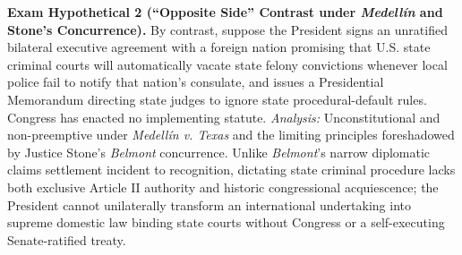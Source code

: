 \documentclass[12pt]{article}
\begin{document}
\textbf{Exam Hypothetical 2 (``Opposite Side'' Contrast under \textit{Medell\'in} and Stone's Concurrence).} By contrast, suppose the President signs an unratified bilateral executive agreement with a foreign nation promising that U.S. state criminal courts will automatically vacate state felony convictions whenever local police fail to notify that nation's consulate, and issues a Presidential Memorandum directing state judges to ignore state procedural-default rules. Congress has enacted no implementing statute. \textit{Analysis:} Unconstitutional and non-preemptive under \textit{Medell\'in v. Texas} and the limiting principles foreshadowed by Justice Stone's \textit{Belmont} concurrence. Unlike \textit{Belmont}'s narrow diplomatic claims settlement incident to recognition, dictating state criminal procedure lacks both exclusive Article II authority and historic congressional acquiescence; the President cannot unilaterally transform an international undertaking into supreme domestic law binding state courts without Congress or a self-executing Senate-ratified treaty.
\end{document}
